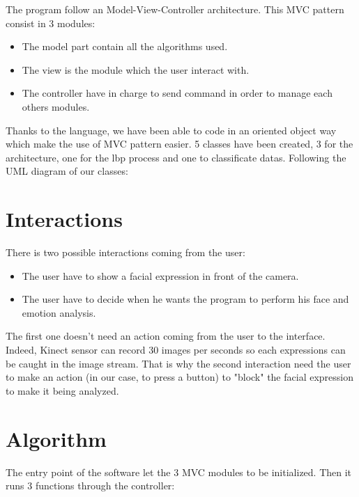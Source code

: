 \vspace{\baselineskip}
\noindent The program follow an Model-View-Controller architecture. This MVC pattern consist in 3 modules:

\begin{itemize}
  \item The model part contain all the algorithms used.
  \item The view is the module which the user interact with.
  \item The controller have in charge to send command in order to manage each others modules.
\end{itemize}

\noindent Thanks to the language, we have been able to code in an oriented object way which make the use of MVC pattern easier. 5 classes have been created, 3 for the architecture, one for the lbp process and one to classificate datas.
\newline
\noindent Following the UML diagram of our classes:

\section{Interactions}
\vspace{\baselineskip}
\noindent There is two possible interactions coming from the user:
\begin{itemize}
  \item The user have to show a facial expression in front of the camera.
  \item The user have to decide when he wants the program to perform his face and emotion analysis.
\end{itemize}

\noindent The first one doesn't need an action coming from the user to the interface. Indeed, Kinect sensor can record 30 images per seconds so each expressions can be caught in the image stream. That is why the second interaction need the user to make an action (in our case, to press a button) to "block" the facial expression to make it being analyzed. 

\section{Algorithm}
\vspace{\baselineskip}

\noindent The entry point of the software let the 3 MVC modules to be initialized. Then it runs 3 functions through the controller:

